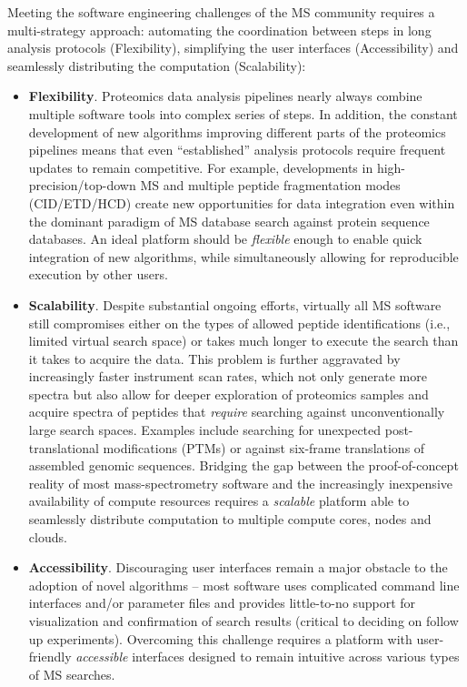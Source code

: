 \documentclass[arial,11pt]{article}
\begin{document}
Meeting the software engineering challenges of the MS  community requires a multi-strategy approach: automating the coordination between steps in long analysis protocols (Flexibility), simplifying the user interfaces (Accessibility) and seamlessly distributing the computation (Scalability):
%
\begin{itemize}
  \item {\bf Flexibility}. Proteomics data analysis pipelines nearly always combine multiple software tools into complex series of steps. In addition, the constant development of new algorithms improving different parts of the proteomics pipelines means that even ``established'' analysis protocols require frequent updates to remain competitive. For example, developments in high-precision/top-down MS and multiple peptide fragmentation modes (CID/ETD/HCD) create new opportunities for data integration even within the dominant paradigm of MS database search against protein sequence databases. An ideal platform should be {\em flexible} enough to enable quick integration of new algorithms, while simultaneously allowing for reproducible execution by other users.

  \item {\bf Scalability}. Despite substantial ongoing efforts, virtually all MS software still compromises either on the types of allowed peptide identifications (i.e., limited virtual search space) or takes much longer to execute the search than it takes to acquire the data. This problem is further aggravated by increasingly faster instrument scan rates, which not only generate more spectra  but also allow for deeper exploration of proteomics samples and acquire spectra of peptides that {\em require} searching against unconventionally large search spaces. Examples include searching for unexpected post-translational modifications (PTMs) or against six-frame translations of assembled genomic sequences. Bridging the gap between the proof-of-concept reality of most mass-spectrometry software and the increasingly inexpensive availability of compute resources requires a {\em scalable} platform able to seamlessly distribute computation to multiple compute cores, nodes and clouds.

  \item {\bf Accessibility}. Discouraging user interfaces remain a major obstacle to the adoption of novel algorithms -- most software uses complicated command line interfaces and/or parameter files and provides little-to-no support for visualization and confirmation of search results (critical to deciding on follow up experiments). Overcoming this challenge requires a platform with user-friendly {\em accessible} interfaces designed to remain intuitive across various types of MS searches.

\end{itemize}
\end{document}
